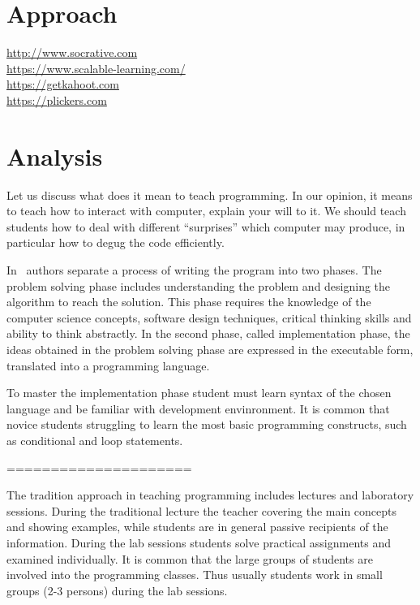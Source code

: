 \documentclass{article}
\begin{document}
\section{Approach} %
\label{sec:plan}

\url{http://www.socrative.com}\\
\url{https://www.scalable-learning.com/}\\ %
\url{https://getkahoot.com}\\
\url{https://plickers.com}

\section{Analysis} %
\label{sec:analysis}

Let us discuss what does it mean to teach programming. In our opinion, it means to teach how to interact with computer, explain
your will to it. We should teach students how to deal with different
``surprises'' which computer may produce, in particular how to degug
the code efficiently.

In~\cite{state_of_art} authors separate a process of writing the
program into two phases. The problem solving phase includes
understanding the problem and designing the algorithm to reach the
solution. This phase requires the knowledge of the computer science
concepts, software design techniques, critical thinking skills and
ability to think abstractly.  In the second phase, called
implementation phase, the ideas obtained in the problem solving phase
are expressed in the executable form, translated into a programming
language.

To master the implementation phase student must learn syntax of the
chosen language and be familiar with development envinronment. It is
common that novice students struggling to learn the most basic
programming constructs, such as conditional and loop statements.

=====================

The tradition approach in teaching programming includes lectures and
laboratory sessions.  During the traditional lecture the teacher
covering the main concepts and showing examples, while students are in
general passive recipients of the information. During the lab sessions
students solve practical assignments and examined individually. It is
common that the large groups of students are involved into the
programming classes. Thus usually students work in small groups (2-3
persons) during the lab sessions. 
\end{document}

